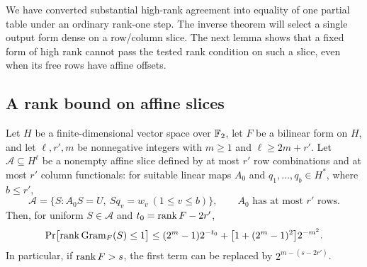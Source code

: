 We have converted substantial high-rank agreement into equality of one
partial table under an ordinary rank-one step.  The inverse theorem
will select a single output form dense on a row/column slice.  The next
lemma shows that a fixed form of high rank cannot pass the tested rank
condition on such a slice, even when its free rows have affine offsets.

\subsection{A rank bound on affine slices}

\begin{lemma}\label{lem:rank-slice}
Let $H$ be a finite-dimensional vector space over $\mathbb F_2$, let $F$ be a
bilinear form on $H$, and let $\ell,r',m$ be nonnegative integers with
$m\geq1$ and $\ell\geq2m+r'$.  Let $\mathcal A\subseteq H^\ell$ be a
nonempty affine slice defined by at most $r'$ row combinations and at
most $r'$ column functionals: for suitable linear maps $A_0$ and
$q_1,\ldots,q_b\in H^*$, where $b\leq r'$,
\[
 \mathcal A=\{S:A_0S=U,\ S q_v=w_v\ (1\leq v\leq b)\},
 \qquad A_0\text{ has at most }r'\text{ rows}.
\]
Then, for uniform $S\in\mathcal A$ and $t_0=\operatorname{rank} F-2r'$,
\begin{equation}\label{eq:lower-rank-slice-bound}
 \Pr\bigl[\operatorname{rank}\operatorname{Gram}_F(S)\leq1\bigr]
 \leq (2^m-1)2^{-t_0}
       +\bigl[1+(2^m-1)^2\bigr]2^{-m^2}.
\end{equation}
In particular, if $\operatorname{rank} F>s$, the first term can be replaced by
$2^{m-(s-2r')}$.
\end{lemma}

